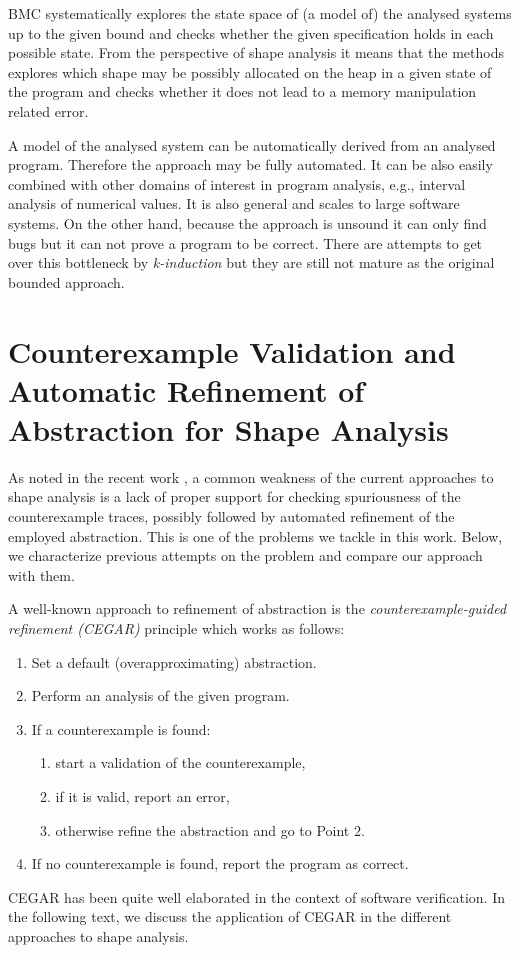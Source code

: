	  BMC systematically explores the state space of (a model of) the analysed systems up
	  to the given bound and checks whether the given specification holds in each possible state.
	  From the perspective of shape analysis it means that the methods explores which shape
	  may be possibly allocated on the heap in a given state of the program
	  and checks whether it does not lead to a memory manipulation related error.
	  
	  A model of the analysed system can be automatically derived from an analysed program.
	  Therefore the approach may be fully automated.
	  It can be also easily combined with other domains of interest in program analysis,
	  e.g., interval analysis of numerical values.
	  It is also general and scales to large software systems.
	  On the other hand, because the approach is unsound it can only find bugs
	  but it can not prove a program to be correct.
	  There are attempts to get over this bottleneck by \emph{k-induction} but they are still not mature
	  as the original bounded approach.

	  \section{Counterexample Validation and Automatic Refinement of Abstraction for Shape Analysis}

	  As noted in the recent work \cite{splinter15}, a common weakness of the
	  current approaches to shape analysis is a lack of proper support for checking
	  spuriousness of the counterexample traces, possibly followed by automated refinement
	  of the employed abstraction. This is one of the problems we tackle in this work.
	  Below, we characterize previous attempts on the problem and compare our
	  approach with them.

	  A well-known approach to refinement of abstraction is the \emph{counterexample-guided
	  refinement (CEGAR)} principle \cite{CEGAR} which works as follows:
	  \begin{enumerate}
		\item Set a default (overapproximating) abstraction.
		\item Perform an analysis of the given program.
		\item If a counterexample is found:
		\begin{enumerate}
			\item start a validation of the counterexample,
			\item if it is valid, report an error,
			\item otherwise refine the abstraction and go to Point $2$.
		\end{enumerate}
		\item If no counterexample is found, report the program as correct.
	  \end{enumerate}
	  CEGAR has been quite well elaborated in the context of software verification.
	  In the following text, we discuss the application of CEGAR in the different
	  approaches to shape analysis.

